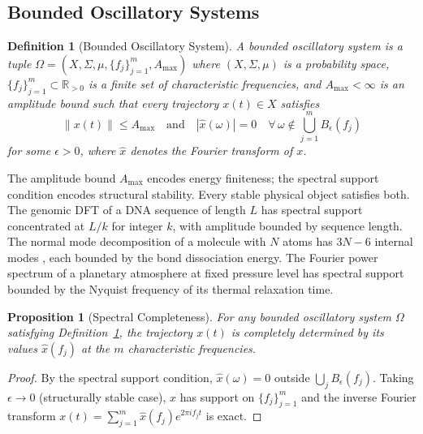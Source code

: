 \documentclass[10pt,twocolumn]{article}
\newtheorem{proposition}[theorem]{Proposition}
\newtheorem{definition}[theorem]{Definition}
\newcommand{\R}{\mathbb{R}}
\begin{document}
\subsection{Bounded Oscillatory Systems}

\begin{definition}[Bounded Oscillatory System]
\label{def:bos}
A \emph{bounded oscillatory system} is a tuple
$\Omega = (X, \Sigma, \mu, \{f_j\}_{j=1}^m, A_{\max})$
where $(X, \Sigma, \mu)$ is a probability space,
$\{f_j\}_{j=1}^m \subset \R_{>0}$ is a finite set of characteristic frequencies,
and $A_{\max} < \infty$ is an amplitude bound such that every
trajectory $x(t) \in X$ satisfies
\begin{equation}
\|x(t)\| \leq A_{\max}
\quad \text{and} \quad
\left| \hat{x}(\omega) \right| = 0 \quad \forall \, \omega \notin \bigcup_{j=1}^m B_\epsilon(f_j)
\label{eq:bos-constraint}
\end{equation}
for some $\epsilon > 0$, where $\hat{x}$ denotes the Fourier transform of $x$.
\end{definition}

The amplitude bound $A_{\max}$ encodes energy finiteness; the spectral support
condition encodes structural stability. Every stable physical object satisfies
both. The genomic DFT of a DNA sequence of length $L$ has spectral support
concentrated at $L/k$ for integer $k$, with amplitude bounded by sequence length.
The normal mode decomposition of a molecule with $N$ atoms has $3N-6$ internal
modes \cite{wilson1955}, each bounded by the bond dissociation energy.
The Fourier power spectrum of a planetary atmosphere at fixed pressure level
has spectral support bounded by the Nyquist frequency of its thermal relaxation time.

\begin{proposition}[Spectral Completeness]
\label{prop:spectral-completeness}
For any bounded oscillatory system $\Omega$ satisfying Definition~\ref{def:bos},
the trajectory $x(t)$ is completely determined by its values $\hat{x}(f_j)$
at the $m$ characteristic frequencies.
\end{proposition}

\begin{proof}
By the spectral support condition, $\hat{x}(\omega) = 0$ outside
$\bigcup_j B_\epsilon(f_j)$. Taking $\epsilon \to 0$ (structurally stable case),
$\hat{x}$ has support on $\{f_j\}_{j=1}^m$ and the inverse Fourier transform
$x(t) = \sum_{j=1}^m \hat{x}(f_j) e^{2\pi i f_j t}$ is exact.
\end{proof}
\end{document}

